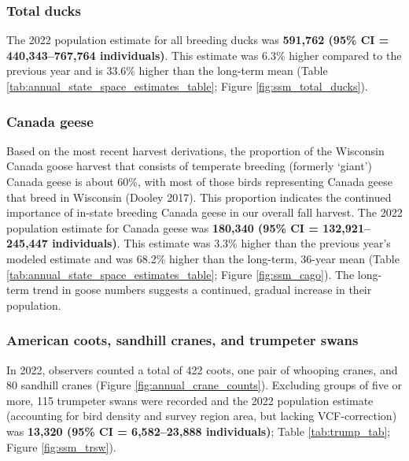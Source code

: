 \documentclass[
  12pt,
]{article}
\begin{document}
\hypertarget{total-ducks}{%
\subsubsection{Total ducks}\label{total-ducks}}

The 2022 population estimate for all breeding ducks was \textbf{591,762
(95\% CI = 440,343--767,764 individuals)}. This estimate was 6.3\%
higher compared to the previous year and is 33.6\% higher than the
long-term mean (Table \ref{tab:annual_state_space_estimates_table};
Figure \ref{fig:ssm_total_ducks}).

\hypertarget{canada-geese}{%
\subsubsection{Canada geese}\label{canada-geese}}

Based on the most recent harvest derivations, the proportion of the
Wisconsin Canada goose harvest that consists of temperate breeding
(formerly `giant') Canada geese is about 60\%, with most of those birds
representing Canada geese that breed in Wisconsin (Dooley 2017). This
proportion indicates the continued importance of in-state breeding
Canada geese in our overall fall harvest. The 2022 population estimate
for Canada geese was \textbf{180,340 (95\% CI = 132,921--245,447
individuals)}. This estimate was 3.3\% higher than the previous year's
modeled estimate and was 68.2\% higher than the long-term, 36-year mean
(Table \ref{tab:annual_state_space_estimates_table}; Figure
\ref{fig:ssm_cago}). The long-term trend in goose numbers suggests a
continued, gradual increase in their population.

\hypertarget{american-coots-sandhill-cranes-and-trumpeter-swans}{%
\subsubsection{American coots, sandhill cranes, and trumpeter
swans}\label{american-coots-sandhill-cranes-and-trumpeter-swans}}

In 2022, observers counted a total of 422 coots, one pair of whooping
cranes, and 80 sandhill cranes (Figure \ref{fig:annual_crane_counts}).
Excluding groups of five or more, 115 trumpeter swans were recorded and
the 2022 population estimate (accounting for bird density and survey
region area, but lacking VCF-correction) was \textbf{13,320 (95\% CI =
6,582--23,888 individuals)}; Table \ref{tab:trump_tab}; Figure
\ref{fig:ssm_trsw}).
\end{document}
